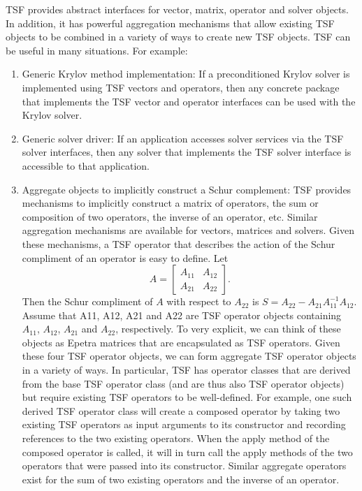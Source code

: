 \documentclass[12pt,relax]{SANDreport}
\begin{document}
TSF provides abstract interfaces for vector, matrix, operator and solver objects.  In
addition, it has powerful aggregation mechanisms that allow existing TSF objects to 
be combined in a variety of ways to create new TSF objects.
TSF can be useful in many situations.  For example:
\begin{enumerate}
\item Generic Krylov method implementation:  If a preconditioned Krylov solver 
is implemented using TSF vectors and operators, then any concrete package that implements
the TSF vector and operator interfaces can be used with the Krylov solver.
\item Generic solver driver:  If an application accesses solver services via the TSF
solver interfaces, then any solver that implements the TSF solver interface is 
accessible to that application.
\item Aggregate objects to implicitly construct a Schur complement: 
TSF provides mechanisms to implicitly 
construct a matrix of operators, the sum or composition of two operators, the inverse
of an operator, etc.  Similar aggregation mechanisms are available for vectors, matrices
and solvers.  Given these mechanisms, a TSF operator that describes the action of the
Schur compliment of an operator is easy to define.  Let
\[
A=\left[
\begin{array}{ll}
A_{11} & A_{12} \\
A_{21} & A_{22}
\end{array} \right].
\]
Then the Schur compliment of $A$ with respect to $A_{22}$ is 
$S = A_{22} - A_{21}A_{11}^{-1}A_{12}$.
Assume that A11, A12, A21 and A22 are TSF operator objects containing $A_{11}$, $A_{12}$,
$A_{21}$ and $A_{22}$, respectively.  To very explicit, we can think of these objects
 as Epetra matrices that are encapsulated as TSF operators.  Given these four TSF operator 
objects, we can form aggregate TSF operator objects in a variety of ways.  In particular,
TSF has operator classes that are derived from the base TSF operator class (and are thus
also TSF operator objects) but require existing TSF operators to be well-defined.  For
example, one such derived TSF operator class will create a composed operator by
taking two existing TSF operators as
input arguments to its constructor and recording references to the two existing operators.
When the apply method of the composed operator is called, it will in turn call the apply
methods of the two operators that were passed into its constructor.  Similar aggregate
operators exist for the sum of two existing operators and the inverse of an operator.


\end{enumerate}
\end{document}
